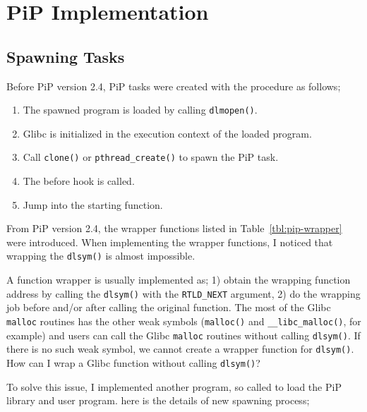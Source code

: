 
\section{PiP Implementation}

\subsection{Spawning Tasks}

Before PiP version 2.4, PiP tasks were created with the procedure as
follows;

\begin{enumerate}
\item The spawned program is loaded by calling {\tt dlmopen()}.
\item Glibc is initialized in the execution context of the loaded
  program.
\item Call {\tt clone()} or {\tt pthread_create()} to spawn the PiP task.
\item The before hook is called.
\item Jump into the starting function.
\end{enumerate}

From PiP version 2.4, the wrapper functions listed in
Table~\ref{tbl:pip-wrapper} were introduced. When implementing the
wrapper functions, I noticed that wrapping the {\tt dlsym()} is
almost impossible.

A function wrapper is usually implemented as; 1) obtain the wrapping
function address by calling the {\tt dlsym()} with the {\tt RTLD_NEXT}
argument, 2) do the wrapping job before and/or after calling the
original function. The most of the Glibc {\tt malloc} routines has
the other weak symbols ({\tt malloc()} and {\tt __libc_malloc()}, for
example) and users can call the Glibc {\tt malloc} routines without
calling {\tt dlsym()}. If there is no such weak symbol, we cannot
create a wrapper function for {\tt dlsym()}. How can I
wrap a Glibc function without calling {\tt dlsym()}?

To solve this issue, I implemented another program, so called
 to load the PiP library and user program. here is
the details of new spawning process;


